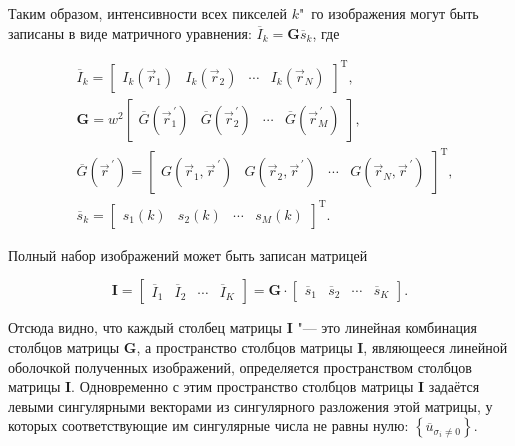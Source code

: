 Таким образом, интенсивности всех пикселей $k$"~го изображения могут быть записаны в виде матричного уравнения: ${\overline{I}}_k=\mathbf{G}{\overline{s}}_k$, где

\begin{align*}
	&{\overline{I}}_k=\left[
		\begin{array}{cccc}
			I_k\left({\vec{r}}_1\right) & I_k\left({\vec{r}}_2\right) & \cdots & I_k\left({\vec{r}}_N\right)
		\end{array}
	\right]^\mathrm{T}, \\
	&\mathbf{G}=w^2 \left[
		\begin{array}{cccc}
			\overline{G}\left({\vec{r}}_1^{\,\prime}\right) & \overline{G}\left({\vec{r}}_2^{\,\prime}\right) & \cdots & \overline{G}\left({\vec{r}}_M^{\,\prime}\right)
		\end{array}
	\right], \\
	&\overline{G}\left({\vec{r}}^{\,\prime}\right)=\left[
		\begin{array}{cccc}
			G\left({\vec{r}}_1,{\vec{r}}^{\,\prime}\right) & G\left({\vec{r}}_2,{\vec{r}}^{\,\prime}\right) & \cdots & G\left({\vec{r}}_N,{\vec{r}}^{\,\prime}\right)
		\end{array}
	\right]^\mathrm{T}, \\
	&{\overline{s}}_k=\left[
		\begin{array}{cccc}
			s_1\left(k\right) & s_2\left(k\right) & \cdots & s_M\left(k\right)
		\end{array}
	\right]^\mathrm{T}.
\end{align*}

Полный набор изображений может быть записан матрицей

\begin{equation*}
	\mathbf{I} = \left[
		\begin{array}{cccc}
			{\overline{I}}_1 & {\overline{I}}_2 & \cdots & {\overline{I}}_K
		\end{array}
	\right] = \mathbf{G} \cdot \left[
		\begin{array}{cccc}
			{\overline{s}}_1 & {\overline{s}}_2 & \cdots & {\overline{s}}_K
		\end{array}
	\right].
\end{equation*}

Отсюда видно, что каждый столбец матрицы $\mathbf{I}$ "--- это линейная комбинация столбцов матрицы $\mathbf{G}$, а пространство столбцов матрицы $\mathbf{I}$, являющееся линейной оболочкой полученных изображений, определяется пространством столбцов матрицы $\mathbf{I}$. Одновременно с этим пространство столбцов матрицы $\mathbf{I}$ задаётся левыми сингулярными векторами из сингулярного разложения этой матрицы, у которых соответствующие им сингулярные числа не равны нулю: $\left\{{\overline{u}}_{\sigma_i\neq0}\right\}$.

